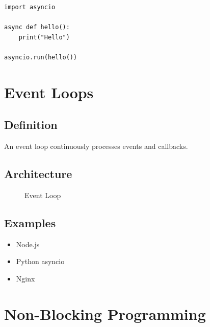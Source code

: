 \begin{verbatim}
import asyncio

async def hello():
    print("Hello")

asyncio.run(hello())
\end{verbatim}

\section{Event Loops}

\subsection{Definition}

An event loop continuously processes events and callbacks.

\subsection{Architecture}

\begin{figure}[h]
\centering
{}
\caption{Event Loop}
\end{figure}

\subsection{Examples}

\begin{itemize}
\item Node.js
\item Python asyncio
\item Nginx
\end{itemize}

\section{Non-Blocking Programming}

